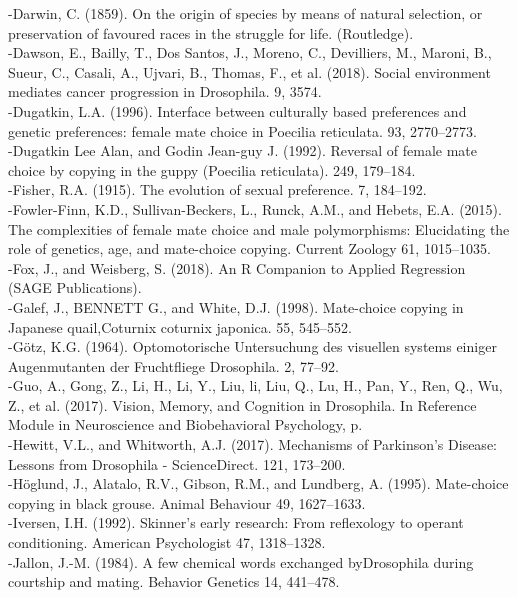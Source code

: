 \documentclass[a4paper, 12pt]{article}
\begin{document}
\begin{singlespace}
{-Darwin, C. (1859). On the origin of species by means of natural selection, or preservation of favoured races in the struggle for life. (Routledge).\\
-Dawson, E., Bailly, T., Dos Santos, J., Moreno, C., Devilliers, M., Maroni, B., Sueur, C., Casali, A., Ujvari, B., Thomas, F., et al. (2018). Social environment mediates cancer progression in Drosophila. 9, 3574.\\
-Dugatkin, L.A. (1996). Interface between culturally based preferences and genetic preferences: female mate choice in Poecilia reticulata. 93, 2770–2773.\\
-Dugatkin Lee Alan, and Godin Jean-guy J. (1992). Reversal of female mate choice by copying in the guppy (Poecilia reticulata). 249, 179–184.\\
-Fisher, R.A. (1915). The evolution of sexual preference. 7, 184–192.\\
-Fowler-Finn, K.D., Sullivan-Beckers, L., Runck, A.M., and Hebets, E.A. (2015). The complexities of female mate choice and male polymorphisms: Elucidating the role of genetics, age, and mate-choice copying. Current Zoology 61, 1015–1035.\\
-Fox, J., and Weisberg, S. (2018). An R Companion to Applied Regression (SAGE Publications).\\
-Galef, J., BENNETT G., and White, D.J. (1998). Mate-choice copying in Japanese quail,Coturnix coturnix japonica. 55, 545–552.\\
-Götz, K.G. (1964). Optomotorische Untersuchung des visuellen systems einiger Augenmutanten der Fruchtfliege Drosophila. 2, 77–92.\\
-Guo, A., Gong, Z., Li, H., Li, Y., Liu,  li, Liu, Q., Lu, H., Pan, Y., Ren, Q., Wu, Z., et al. (2017). Vision, Memory, and Cognition in Drosophila. In Reference Module in Neuroscience and Biobehavioral Psychology, p.\\
-Hewitt, V.L., and Whitworth, A.J. (2017). Mechanisms of Parkinson’s Disease: Lessons from Drosophila - ScienceDirect. 121, 173–200.\\
-Höglund, J., Alatalo, R.V., Gibson, R.M., and Lundberg, A. (1995). Mate-choice copying in black grouse. Animal Behaviour 49, 1627–1633.\\
-Iversen, I.H. (1992). Skinner’s early research: From reflexology to operant conditioning. American Psychologist 47, 1318–1328.\\
-Jallon, J.-M. (1984). A few chemical words exchanged byDrosophila during courtship and mating. Behavior Genetics 14, 441–478.\\
}
\end{singlespace}
\end{document}
